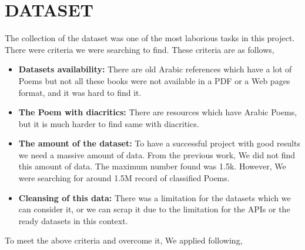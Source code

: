 \chapter{\uppercase{Dataset}}\label{ch:datasets}  

  The collection of the dataset was one of the most laborious tasks in this project. There were criteria we were searching to find. These criteria are as follows,
  \begin{itemize}
    
  \item \textbf{Datasets availability:} There are old Arabic references which have a lot of Poems but not all these books were not available in a PDF or a Web pages format, and it was hard to find it.
    
  \item \textbf{The Poem with diacritics:} There are resources which have Arabic Poems, but it is much harder to find same with diacritics.
    
  \item \textbf{The amount of the dataset:} To have a successful project with good results we need a massive amount of data. From the previous work, We did not find this amount of data. The maximum number found was 1.5k. However, We were searching for around 1.5M record of classified Poems.

  
\item \textbf{Cleansing of this data:} There was a limitation for the datasets which we can consider it, or we can scrap it due to the limitation for the APIs or the ready datasets in this context.
  
\end{itemize}
To meet the above criteria and overcome it, We applied following,

